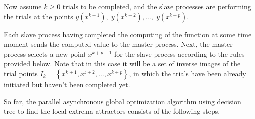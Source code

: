 \documentclass{cmi}
\begin{document}
Now assume $k\geq0$ trials to be completed, and the slave processes are performing the trials at the points $y\left(x^{k+1}\right),\;y\left(x^{k+2}\right),\ldots,\;y\left(x^{k+p}\right)$.

Each slave process having completed the computing of the function at some time moment sends  the computed value to the master process. Next, the master process selects a new point  $x^{k+p+1}$ for the slave process according to the rules provided below. Note that in this case it will be a set of inverse images of the trial points  $I_k=\left\{x^{k+1},x^{k+2},\ldots,x^{k+p}\right\}$, in which the trials have been already initiated but haven't been completed yet.

So far, the parallel asynchronous global optimization algorithm using decision tree to find the local  extrema attractors consists of the following steps.
\end{document}
